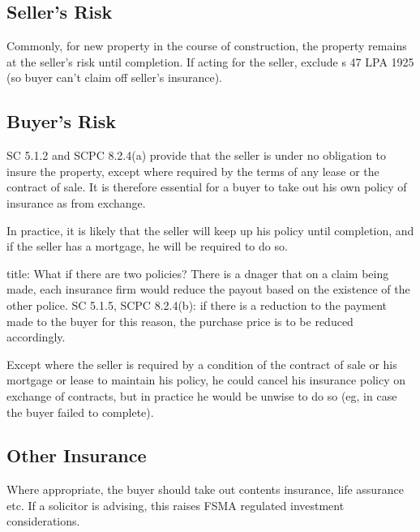 \documentclass[
]{article}
\newenvironment{Shaded}{}{}
\newcommand{\NormalTok}[1]{#1}
\begin{document}
\hypertarget{sellers-risk}{%
\subsection{Seller's Risk}\label{sellers-risk}}

Commonly, for new property in the course of construction, the property
remains at the seller's risk until completion. If acting for the seller,
exclude s 47 LPA 1925 (so buyer can't claim off seller's insurance).

\hypertarget{buyers-risk}{%
\subsection{Buyer's Risk}\label{buyers-risk}}

SC 5.1.2 and SCPC 8.2.4(a) provide that the seller is under no
obligation to insure the property, except where required by the terms of
any lease or the contract of sale. It is therefore essential for a buyer
to take out his own policy of insurance as from exchange.

In practice, it is likely that the seller will keep up his policy until
completion, and if the seller has a mortgage, he will be required to do
so.

\begin{Shaded}
\begin{Highlighting}[]
\NormalTok{title: What if there are two policies?}
\NormalTok{There is a dnager that on a claim being made, each insurance firm would reduce the payout based on the existence of the other police. SC 5.1.5, SCPC 8.2.4(b): if there is a reduction to the payment made to the buyer for this reason, the purchase price is to be reduced accordingly. }
\end{Highlighting}
\end{Shaded}

Except where the seller is required by a condition of the contract of
sale or his mortgage or lease to maintain his policy, he could cancel
his insurance policy on exchange of contracts, but in practice he would
be unwise to do so (eg, in case the buyer failed to complete).

\hypertarget{other-insurance}{%
\subsection{Other Insurance}\label{other-insurance}}

Where appropriate, the buyer should take out contents insurance, life
assurance etc. If a solicitor is advising, this raises FSMA regulated
investment considerations.
\end{document}
